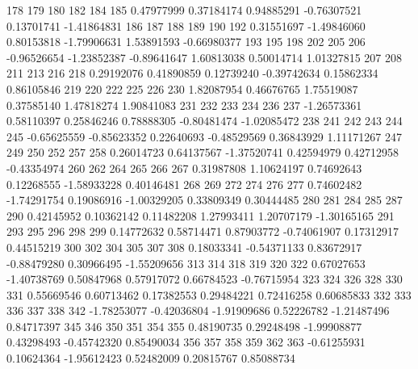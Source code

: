 \documentclass{article}
\begin{document}
\begin{Schunk}
\begin{Soutput}
        178         179         180         182         184         185 
 0.47977999  0.37184174  0.94885291 -0.76307521  0.13701741 -1.41864831 
        186         187         188         189         190         192 
 0.31551697 -1.49846060  0.80153818 -1.79906631  1.53891593 -0.66980377 
        193         195         198         202         205         206 
-0.96526654 -1.23852387 -0.89641647  1.60813038  0.50014714  1.01327815 
        207         208         211         213         216         218 
 0.29192076  0.41890859  0.12739240 -0.39742634  0.15862334  0.86105846 
        219         220         222         225         226         230 
 1.82087954  0.46676765  1.75519087  0.37585140  1.47818274  1.90841083 
        231         232         233         234         236         237 
-1.26573361  0.58110397  0.25846246  0.78888305 -0.80481474 -1.02085472 
        238         241         242         243         244         245 
-0.65625559 -0.85623352  0.22640693 -0.48529569  0.36843929  1.11171267 
        247         249         250         252         257         258 
 0.26014723  0.64137567 -1.37520741  0.42594979  0.42712958 -0.43354974 
        260         262         264         265         266         267 
 0.31987808  1.10624197  0.74692643  0.12268555 -1.58933228  0.40146481 
        268         269         272         274         276         277 
 0.74602482 -1.74291754  0.19086916 -1.00329205  0.33809349  0.30444485 
        280         281         284         285         287         290 
 0.42145952  0.10362142  0.11482208  1.27993411  1.20707179 -1.30165165 
        291         293         295         296         298         299 
 0.14772632  0.58714471  0.87903772 -0.74061907  0.17312917  0.44515219 
        300         302         304         305         307         308 
 0.18033341 -0.54371133  0.83672917 -0.88479280  0.30966495 -1.55209656 
        313         314         318         319         320         322 
 0.67027653 -1.40738769  0.50847968  0.57917072  0.66784523 -0.76715954 
        323         324         326         328         330         331 
 0.55669546  0.60713462  0.17382553  0.29484221  0.72416258  0.60685833 
        332         333         336         337         338         342 
-1.78253077 -0.42036804 -1.91909686  0.52226782 -1.21487496  0.84717397 
        345         346         350         351         354         355 
 0.48190735  0.29248498 -1.99908877  0.43298493 -0.45742320  0.85490034 
        356         357         358         359         362         363 
-0.61255931  0.10624364 -1.95612423  0.52482009  0.20815767  0.85088734 

\end{Soutput}
\end{Schunk}
\end{document}
